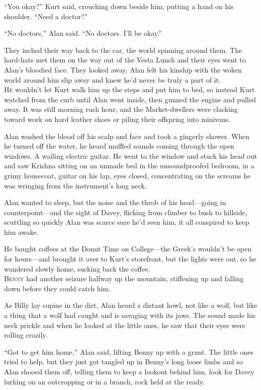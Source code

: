 \documentclass{article}
\begin{document}
``You okay?'' Kurt said, crouching down beside him, putting a hand on
his shoulder.  ``Need a doctor?''

``No doctors,'' Alan said.  ``No doctors.  I'll be okay.''

They inched their way back to the car, the world spinning around them. 
The hard-hats met them on the way out of the Vesta Lunch and their
eyes went to Alan's bloodied face.  They looked away.  Alan felt his
kinship with the woken world around him slip away and knew he'd never
be truly a part of it.
\\
\lettrine[lines=3, lhang=.5, nindent=0pt, findent=2pt]{H}{e} wouldn't let Kurt walk him up the steps and put him to bed, so
instead Kurt watched from the curb until Alan went inside, then gunned
the engine and pulled away.  It was still morning rush hour, and the
Market-dwellers were clacking toward work on hard leather shoes or
piling their offspring into minivans.

Alan washed the blood off his scalp and face and took a gingerly
shower.  When he turned off the water, he heard muffled sounds coming
through the open windows.  A wailing electric guitar.  He went to the
window and stuck his head out and saw Krishna sitting on an unmade bed
in the unsoundproofed bedroom, in a grimy housecoat, guitar on his
lap, eyes closed, concentrating on the screams he was wringing from
the instrument's long neck.

Alan wanted to sleep, but the noise and the throb of his head---going
in counterpoint---and the sight of Davey, flicking from climber to
bush to hillside, scuttling so quickly Alan was scarce sure he'd seen
him, it all conspired to keep him awake.

He bought coffees at the Donut Time on College---the Greek's wouldn't
be open for hours---and brought it over to Kurt's storefront, but the
lights were out, so he wandered slowly home, sucking back the coffee.
\\
\lettrine[lines=3, lhang=.5, nindent=0pt, findent=2pt]{B}{enny} had another seizure halfway up the mountain, stiffening up and
falling down before they could catch him.

As Billy lay supine in the dirt, Alan heard a distant howl, not like a
wolf, but like a thing that a wolf had caught and is savaging with its
jaws.  The sound made his neck prickle and when he looked at the
little ones, he saw that their eyes were rolling crazily.

``Got to get him home,'' Alan said, lifting Benny up with a grunt. 
The little ones tried to help, but they just got tangled up in Benny's
long loose limbs and so Alan shooed them off, telling them to keep a
lookout behind him, look for Davey lurking on an outcropping or in a
branch, rock held at the ready.
\end{document}
